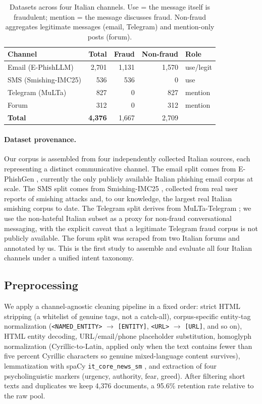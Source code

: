 \documentclass[preprint,12pt,authoryear]{elsarticle}
\begin{document}
\begin{table}[t]
\centering
\caption{Datasets across four Italian channels. Use = the message
itself is fraudulent; mention = the message discusses fraud.
Non-fraud aggregates legitimate messages (email, Telegram) and
mention-only posts (forum).}
\label{tab:data}
\begin{tabular}{lrrrl}
\toprule
\textbf{Channel} & \textbf{Total} & \textbf{Fraud} & \textbf{Non-fraud} & \textbf{Role} \\
\midrule
Email (E-PhishLLM) & 2{,}701 & 1{,}131 & 1{,}570 & use/legit \\
SMS (Smishing-IMC25) & 536 & 536 & 0 & use \\
Telegram (MuLTa) & 827 & 0 & 827 & mention \\
Forum & 312 & 0 & 312 & mention \\
\midrule
\textbf{Total} & \textbf{4{,}376} & 1{,}667 & 2{,}709 & \\
\bottomrule
\end{tabular}
\end{table}

\paragraph*{Dataset provenance.} Our corpus is assembled from four
independently collected Italian sources, each representing a distinct
communicative channel. The email split comes from E-PhishGen
\citep{pajola2025ephishgen}, currently the only publicly available
Italian phishing email corpus at scale. The SMS split comes from
Smishing-IMC25 \citep{agarwal2025smishing}, collected from real user
reports of smishing attacks and, to our knowledge, the largest real
Italian smishing corpus to date. The Telegram split derives from
MuLTa-Telegram \citep{leonardelli2025multa}; we use the non-hateful
Italian subset as a proxy for non-fraud conversational messaging,
with the explicit caveat that a legitimate Telegram fraud corpus is
not publicly available. The forum split was scraped from two Italian
forums and annotated by us. This is the first study to assemble and
evaluate all four Italian channels under a unified intent taxonomy.

\subsection{Preprocessing}

We apply a channel-agnostic cleaning pipeline in a fixed order:
strict HTML stripping (a whitelist of genuine tags, not a catch-all),
corpus-specific entity-tag normalization (\texttt{<NAMED\_ENTITY>}
$\to$ \texttt{[ENTITY]}, \texttt{<URL>} $\to$ \texttt{[URL]}, and so
on), HTML entity decoding, URL/email/phone placeholder substitution,
homoglyph normalization (Cyrillic-to-Latin, applied only when the
text contains fewer than five percent Cyrillic characters so genuine
mixed-language content survives), lemmatization with spaCy
\texttt{it\_core\_news\_sm} \citep{spacy}, and extraction of four
psycholinguistic markers (urgency, authority, fear, greed). After
filtering short texts and duplicates we keep 4{,}376 documents, a
95.6\% retention rate relative to the raw pool.
\end{document}
